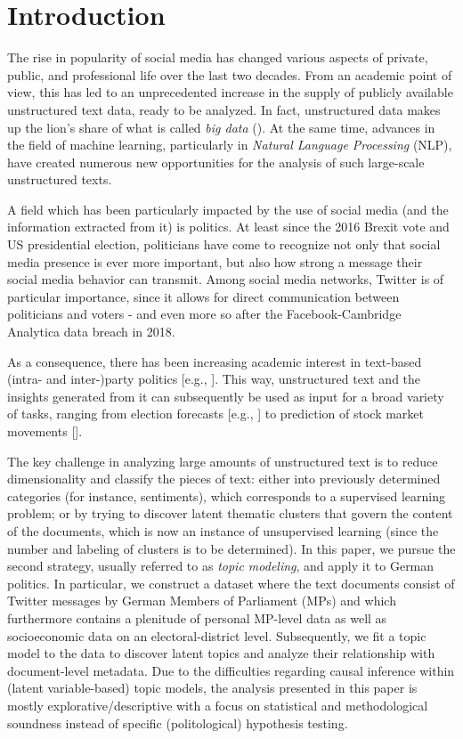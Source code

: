 \section{Introduction}

The rise in popularity of social media has changed various aspects of private, public, and professional life over the last two decades. From an academic point of view, this has led to an unprecedented increase in the supply of publicly available unstructured text data, ready to be analyzed. In fact, unstructured data makes up the lion's share of what is called \textit{big data} (\citealp{gandomi2015beyond}). At the same time, advances in the field of machine learning, particularly in \textit{Natural Language Processing} (NLP), have created numerous new opportunities for the analysis of such large-scale unstructured texts.

A field which has been particularly impacted by the use of social media (and the information extracted from it) is politics. At least since the 2016 Brexit vote and US presidential election, politicians have come to recognize not only that social media presence is ever more important, but also how strong a message their social media behavior can transmit. Among social media networks, Twitter is of particular importance, since it allows for direct communication between politicians and voters - and even more so after the Facebook-Cambridge Analytica data breach in 2018.

As a consequence, there has been increasing academic interest in text-based (intra- and inter-)party politics [e.g., \cite{ceron2017intra, daniel2019static, grimmer2010bayesian, quinlan2018show}]. This way, unstructured text and the insights generated from it can subsequently be used as input for a broad variety of tasks, ranging from election forecasts [e.g., \cite{burnap2016140, jungherr2016twitter, tumasjan2010predicting}] to prediction of stock market movements [\cite{nisar2018twitter}].

The key challenge in analyzing large amounts of unstructured text is to reduce dimensionality and classify the pieces of text: either into previously determined categories (for instance, sentiments), which corresponds to a supervised learning problem; or by trying to discover latent thematic clusters that govern the content of the documents, which is now an instance of unsupervised learning (since the number and labeling of clusters is to be determined). In this paper, we pursue the second strategy, usually referred to as \textit{topic modeling}, and apply it to German politics. In particular, we construct a dataset where the text documents consist of Twitter messages by German Members of Parliament (MPs) and which furthermore contains a plenitude of personal MP-level data as well as socioeconomic data on an electoral-district level. Subsequently, we fit a topic model to the data to discover latent topics and analyze their relationship with document-level metadata. Due to the difficulties regarding causal inference within (latent variable-based) topic models, the analysis presented in this paper is mostly explorative/descriptive with a focus on statistical and methodological soundness instead of specific (politological) hypothesis testing.

